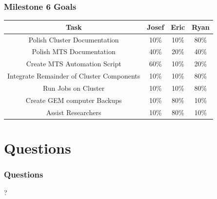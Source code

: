 \documentclass[aspectratio=169]{beamer}
\begin{document}
\begin{frame}

  \frametitle{Milestone 6 Goals}

  \begin{center}
    \begin{tabular}{|c|c|c|c|}
      \hline
      Task & Josef & Eric & Ryan \\
      \hline
      Polish Cluster Documentation & 10\% & 10\% & 80\% \\
      Polish MTS Documentation & 40\% & 20\% & 40\% \\
      Create MTS Automation Script & 60\% & 10\% & 20\% \\
      Integrate Remainder of Cluster Components & 10\% & 10\% & 80\% \\
      Run Jobs on Cluster & 10\% & 10\% & 80\% \\
      Create GEM computer Backups & 10\% & 80\% & 10\% \\
      Assist Researchers & 10\% & 80\% & 10\% \\
      \hline
    \end{tabular}
  \end{center}

\end{frame}



\section{Questions}

\begin{frame}

  \frametitle{Questions}

  \begin{center}
    {\fontsize{200}{200}\selectfont ?}
  \end{center}
  
\end{frame}

\end{document}

